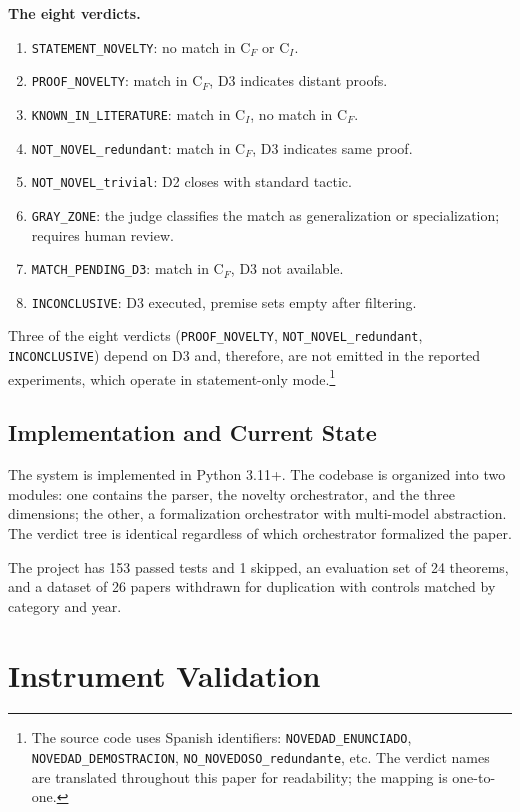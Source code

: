 \documentclass{article}
\theoremstyle{remark}
\begin{document}
\textbf{The eight verdicts.}

\begin{enumerate}
\item \texttt{STATEMENT\_NOVELTY}: no match in C$_F$ or C$_I$.
\item \texttt{PROOF\_NOVELTY}: match in C$_F$, D3 indicates distant proofs.
\item \texttt{KNOWN\_IN\_LITERATURE}: match in C$_I$, no match in C$_F$.
\item \texttt{NOT\_NOVEL\_redundant}: match in C$_F$, D3 indicates same proof.
\item \texttt{NOT\_NOVEL\_trivial}: D2 closes with standard tactic.
\item \texttt{GRAY\_ZONE}: the judge classifies the match as generalization or specialization; requires human review.
\item \texttt{MATCH\_PENDING\_D3}: match in C$_F$, D3 not available.
\item \texttt{INCONCLUSIVE}: D3 executed, premise sets empty after filtering.
\end{enumerate}

Three of the eight verdicts (\texttt{PROOF\_NOVELTY}, \texttt{NOT\_NOVEL\_redundant}, \texttt{INCONCLUSIVE}) depend on D3 and, therefore, are not emitted in the reported experiments, which operate in statement-only mode.\footnote{The source code uses Spanish identifiers: \texttt{NOVEDAD\_ENUNCIADO}, \texttt{NOVEDAD\_DEMOSTRACION}, \texttt{NO\_NOVEDOSO\_redundante}, etc. The verdict names are translated throughout this paper for readability; the mapping is one-to-one.}

\subsection{Implementation and Current State}

The system is implemented in Python 3.11+. The codebase is organized into two modules: one contains the parser, the novelty orchestrator, and the three dimensions; the other, a formalization orchestrator with multi-model abstraction. The verdict tree is identical regardless of which orchestrator formalized the paper.

The project has 153 passed tests and 1 skipped, an evaluation set of 24 theorems, and a dataset of 26 papers withdrawn for duplication with controls matched by category and year.


\section{Instrument Validation}
\end{document}
